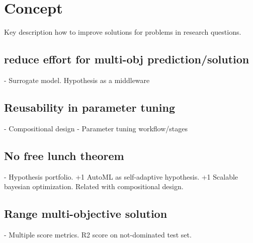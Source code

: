 \chapter{Concept}
Key description how to improve solutions for problems in research questions.

    \section{reduce effort for multi-obj prediction/solution}
        - Surrogate model. Hypothesis as a middleware

    \section{Reusability in parameter tuning}
        - Compositional design
        - Parameter tuning workflow/stages 

    \section{No free lunch theorem}
        - Hypothesis portfolio. +1 AutoML as self-adaptive hypothesis. +1 Scalable bayesian optimization. Related with compositional design.

    \section{Range multi-objective solution}
        - Multiple score metrics. R2 score on not-dominated test set.

